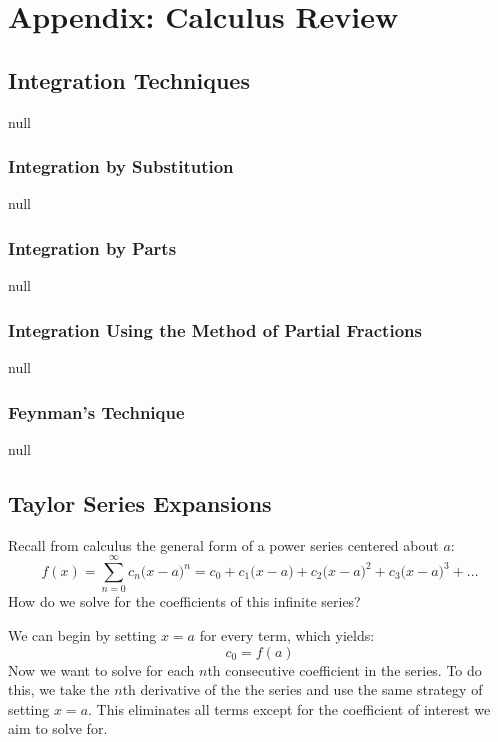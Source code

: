 \chapter{Appendix: Calculus Review}
\section{Integration Techniques}
null
\subsection{Integration by Substitution}
null
\subsection{Integration by Parts}
null
\subsection{Integration Using the Method of Partial Fractions}
null
\subsection{Feynman's Technique}
null
\section{Taylor Series Expansions}
Recall from calculus the general form of a power series centered about $a$:
    \begin{equation}
        f(x) = \sum_{n=0}^{\infty} c_n {\big(x - a\big)}^n = c_0 + c_1{\big(x - a\big)}
            + c_2{\big(x - a\big)}^2 + c_3{\big(x - a\big)}^3 + ...
        \label{eq:power_series}
    \end{equation}
How do we solve for the coefficients of this infinite series?

\vspace{0.5cm}
\noindent
We can begin by setting $x = a$ for every term, which yields:
    \begin{equation}
        c_0 = f(a)
        \label{eq:power_first}
    \end{equation}
Now we want to solve for each $n$th consecutive coefficient in the series.  To do this, we take the $n$th derivative of the the series and use the same strategy of setting $x = a$.  This eliminates all terms except for the coefficient of interest we aim to solve for.

